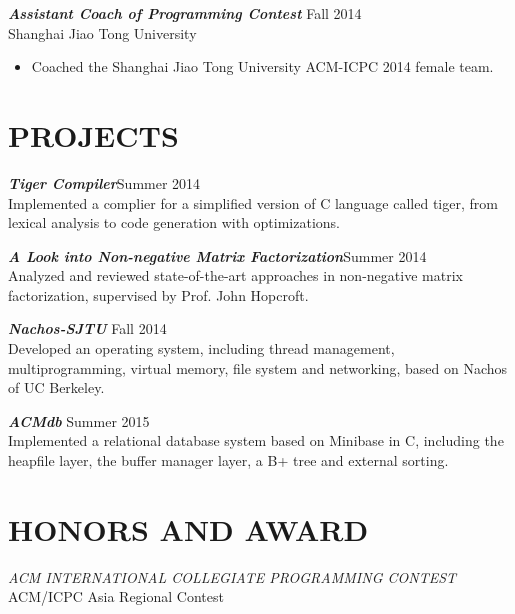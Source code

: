 \documentclass[margin, 10pt]{res} %
\begin{document}
\begin{resume}
{\sl \textbf{Assistant Coach of Programming Contest}} \hfill Fall 2014 \\
Shanghai Jiao Tong University
\begin{itemize}
\item Coached the Shanghai Jiao Tong University ACM-ICPC 2014 female team.
\end{itemize}


 
\section{PROJECTS}

{\sl \textbf {Tiger Compiler}}\hfill Summer 2014\\
Implemented a complier for a simplified version of C language called tiger, from lexical analysis to code generation with optimizations.

{\sl \textbf {A Look into Non-negative Matrix Factorization}}\hfill Summer 2014\\
Analyzed and reviewed state-of-the-art approaches in non-negative matrix factorization, supervised by Prof. John Hopcroft.

{\sl \textbf {Nachos-SJTU}} \hfill Fall 2014\\
Developed an operating system, including thread management, multiprogramming, virtual memory, file system and networking, based on Nachos of UC Berkeley.

{\sl \textbf {ACMdb}} \hfill Summer 2015\\
Implemented a relational database system based on Minibase in C, including the heapfile layer, the buffer manager layer,  a B+ tree and external sorting.



 
\section{HONORS AND AWARD}

{\sl ACM INTERNATIONAL COLLEGIATE PROGRAMMING CONTEST} \\
ACM/ICPC Asia Regional Contest 


\end{resume}
\end{document}
